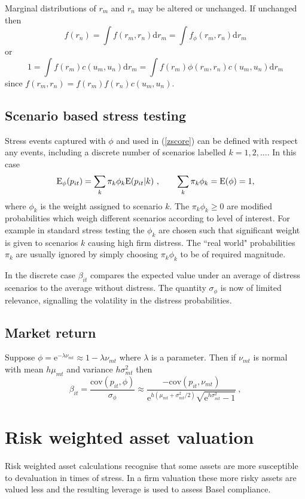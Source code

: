 \documentclass[authoryear]{elsarticle}
\newcommand{\E}{\mathrm{E}}
\newcommand{\e}{\mathrm{e}}
\newcommand{\cov}{\mathrm{cov}}
\newcommand{\de}{\mathrm{d}}
\newcommand{\eref}[1]{(\ref{#1})}
\newcommand{\cq}{\ , \qquad}
\begin{document}
   
Marginal distributions of $r_m$ and $r_n$ may be altered or unchanged. If unchanged then
$$
f(r_n) = \int f(r_m,r_n) \de r_m = \int f_\phi(r_m,r_n) \de r_m
$$
or 
$$
1 = \int f(r_m)c(u_m,u_n) \de r_m = \int f(r_m)\phi(r_m,r_n) c(u_m,u_n) \de r_m
$$
since $f(r_m,r_n)=f(r_m)f(r_n)c(u_m,u_n)$.   


 
 \subsection{Scenario based stress testing}
 Stress events captured with $\phi$ and used  in \eref{zscore}  can be defined with respect any events, including a discrete number of scenarios labelled $k=1,2, \ldots$.   In this case 
$$
\Es(p_{it})= \sum_k \pi_k\phi_k\E(p_{it}|k)\cq \sum_k\pi_k\phi_k = \E(\phi) = 1 ,
$$
where $\phi_k$ is the weight assigned to scenario $k$.   The $\pi_k\phi_k\ge 0$ are  modified  probabilities which weigh different scenarios according to level of interest.   For example in standard stress testing the $\phi_k$ are chosen such that significant weight is given to scenarios $k$ causing high  firm distress.   The ``real world" probabilities $\pi_k$ are  usually ignored by  simply choosing  $\pi_k\phi_k$ to be of  required magnitude. 

In the discrete case $\beta_{it}$ compares the expected value under an average of distress scenarios to the average without distress.  The quantity $\sigma_\phi$ is now of limited relevance, signalling the volatility in the distress probabilities. 

\subsection{Market return}

Suppose $\phi=\e^{-\lambda\nu_{mt}}\approx 1-\lambda\nu_{mt}$ where $\lambda$ is a parameter.   Then  if $\nu_{mt}$ is normal with mean $h\mu_{mt}$ and variance $ h\sigma^2_{mt}$ then
$$
\beta_{it} = \frac{\cov(p_{it},\phi)}{\sigma_\phi}  \approx \frac{-\cov(p_{it},\nu_{mt})}{\e^{h(\mu_{mt}+\sigma_{mt}^2/2)}\sqrt{\e^{h\sigma_{mt}^2}-1}}\ ,
$$


   

\section{Risk weighted asset valuation}

Risk weighted asset calculations recognise that some assets are more susceptible to  devaluation in times of stress.  In a firm  valuation these more risky assets are  valued less and the  resulting leverage is used to assess Basel compliance.
\end{document}
